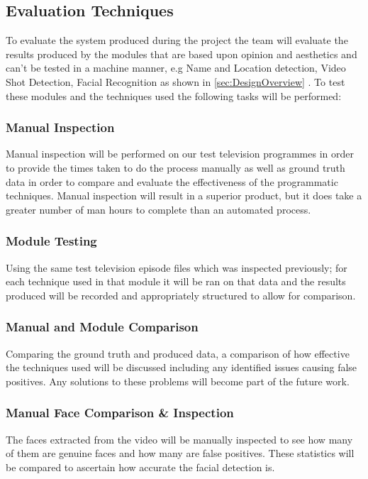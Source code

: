 \subsection{Evaluation Techniques}
\label{sec:EvalTechniques}
To evaluate the system produced during the project the team will evaluate the results produced by the modules that are based upon opinion and aesthetics and can’t be tested in a machine manner, e.g Name and Location detection, Video Shot Detection, Facial Recognition as shown in \ref{sec:DesignOverview} . To test these modules and the techniques used the following tasks will be performed:

\subsubsection{Manual Inspection}
Manual inspection will be performed on our test television programmes in order to provide the times taken to do the process manually 
as well as ground truth data in order to compare and evaluate the effectiveness of the programmatic techniques. Manual inspection will result
in a superior product, but it does take a greater number of man hours to complete than an automated process.

\subsubsection{Module Testing}
Using the same test television episode files which was inspected previously; for each technique used in that module it will be ran on that data and the results produced will be recorded and appropriately structured to allow for comparison.

\subsubsection{Manual and Module Comparison}
Comparing the ground truth and produced data, a comparison of how effective the techniques used will be discussed including any identified issues causing false positives. Any solutions to these problems will become part of the future work.

\subsubsection{Manual Face Comparison \& Inspection}
The faces extracted from the video will be manually inspected to see how many of them are genuine faces and how many are false positives. These statistics will be compared to ascertain how accurate the facial detection is. 

